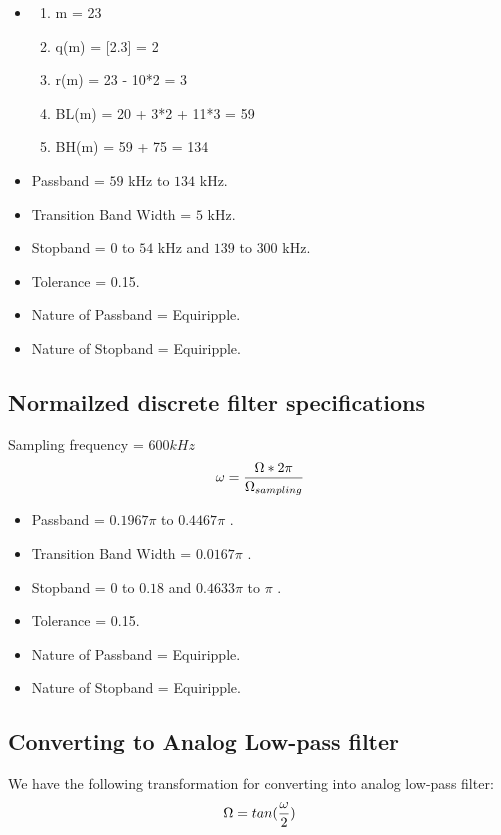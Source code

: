 \documentclass{article}
\begin{document}
\begin{itemize}
    \item \begin{enumerate}
                \item m = 23
                \item q(m) = [2.3] = 2
                \item r(m) = 23 - 10*2 = 3
                \item BL(m) = 20 + 3*2 + 11*3 = 59
                \item BH(m) = 59 + 75 = 134
            \end{enumerate}

    \item Passband = $59$ kHz to $134$ kHz.
    \item Transition Band Width = $5$ kHz.
    \item Stopband = $0$ to $54$ kHz and $139$ to $300$ kHz.
    \item Tolerance = 0.15.
    \item Nature of Passband = Equiripple.
    \item Nature of Stopband = Equiripple.
\end{itemize}


\subsection{Normailzed discrete filter specifications}
Sampling frequency = $600 kHz$\\
\begin{equation}
    \omega = \frac{\Omega * 2\pi}{\Omega _{sampling}}\\
\end{equation}

\begin{itemize}
    \item Passband = $0.1967\pi$ to $0.4467\pi$ .
    \item Transition Band Width = $0.0167\pi$ .
    \item Stopband = $0$ to $0.18$  and $0.4633\pi$ to $\pi$ .
    \item Tolerance = 0.15.
    \item Nature of Passband = Equiripple.
    \item Nature of Stopband = Equiripple.
\end{itemize}


\subsection{Converting to Analog Low-pass filter}
We have the following transformation for converting into analog low-pass filter:\\
\begin{equation}
    \Omega = tan(\frac{\omega}{2})\\
\end{equation}
\end{document}
